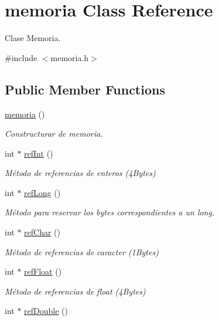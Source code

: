 \hypertarget{classmemoria}{}\section{memoria Class Reference}
\label{classmemoria}


Clase Memoria.  




{\ttfamily \#include $<$memoria.\+h$>$}

\subsection*{Public Member Functions}
\begin{DoxyCompactItemize}
\item 
\hyperlink{classmemoria_adaca81db3f9a5adb4307792e353e4c11}{memoria} ()
\begin{DoxyCompactList}\small\item\em Constructurar de memoria. \end{DoxyCompactList}\item 
int $\ast$ \hyperlink{classmemoria_a5a157c4a135a50d361d536a732bc48ef}{ref\+Int} ()
\begin{DoxyCompactList}\small\item\em Método de referencias de enteros (4\+Bytes) \end{DoxyCompactList}\item 
int $\ast$ \hyperlink{classmemoria_a5d37a73a8c7e09a41f5bbd6201ddd903}{ref\+Long} ()
\begin{DoxyCompactList}\small\item\em Método para reservar los bytes correspondientes a un long. \end{DoxyCompactList}\item 
int $\ast$ \hyperlink{classmemoria_a7ef0313c2061395714ac46a7c0481fd6}{ref\+Char} ()
\begin{DoxyCompactList}\small\item\em Método de referencias de caracter (1\+Bytes) \end{DoxyCompactList}\item 
int $\ast$ \hyperlink{classmemoria_a86e29cab7b3c10ea03438114e5ff05a4}{ref\+Float} ()
\begin{DoxyCompactList}\small\item\em Método de referencias de float (4\+Bytes) \end{DoxyCompactList}\item 
int $\ast$ \hyperlink{classmemoria_a5cacadfe9011d8c762a94f0688ee9589}{ref\+Double} ()

\end{DoxyCompactItemize}
